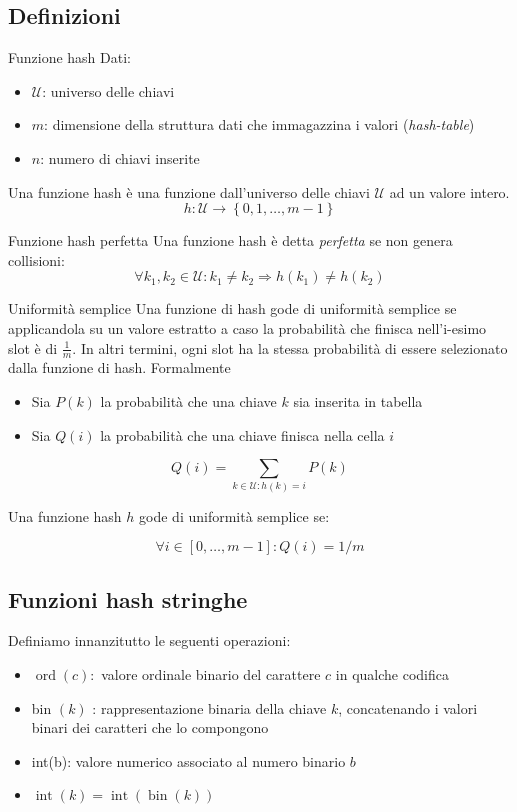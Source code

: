 \subsection{Definizioni}
\begin{definizione}{Funzione hash}
	Dati:
	\begin{itemize}
		\item $ \mathcal{U} $: universo delle chiavi
		\item $ m $: dimensione della struttura dati che immagazzina i valori (\textit{hash-table})
		\item $ n $: numero di chiavi inserite
	\end{itemize}
	Una funzione hash è una funzione dall'universo delle chiavi $ \mathcal{U} $ ad un valore intero.
	\[
		h: \mathcal{U} \rightarrow \left\{0, 1, \dots, m-1\right\}
	\]
\end{definizione}
\begin{definizione}{Funzione hash perfetta}
	Una funzione hash è detta \textit{perfetta} se non genera collisioni:
	\[
		\forall k_1, k_2 \in \mathcal{U}: k_1 \neq k_2 \Rightarrow h(k_1) \neq h(k_2)
	\]
\end{definizione}
\begin{definizione}{Uniformità semplice}
	Una funzione di hash gode di uniformità semplice se applicandola su un valore estratto a caso la probabilità che finisca nell'i-esimo slot è di $ \frac{1}{m} $. In altri termini, ogni slot ha la stessa probabilità di essere selezionato dalla funzione di hash.
	\vskip3mm
	Formalmente
	\begin{itemize}
		\item Sia $P(k)$ la probabilità che una chiave $k$ sia inserita in tabella
		\item Sia $Q(i)$ la probabilità che una chiave finisca nella cella $i$
	\end{itemize}

	\[
		Q(i)=\sum_{k \in \mathcal{U}: h(k)=i} P(k)
	\]

	Una funzione hash $h$ gode di uniformità semplice se:

	\[
		\forall i \in[0, \ldots, m-1]: Q(i)=1 / m
	\]
\end{definizione}
\subsection{Funzioni hash stringhe}
Definiamo innanzitutto le seguenti operazioni:
\begin{itemize}
	\item $\operatorname{ord}(c):$ valore ordinale binario del carattere $c$ in qualche codifica
	\item bin $(k)$ : rappresentazione binaria della chiave $k$, concatenando i valori binari dei caratteri che lo compongono
	\item int(b): valore numerico associato al numero binario $b$
	\item $\operatorname{int}(k)=\operatorname{int}(\operatorname{bin}(k))$
\end{itemize}

